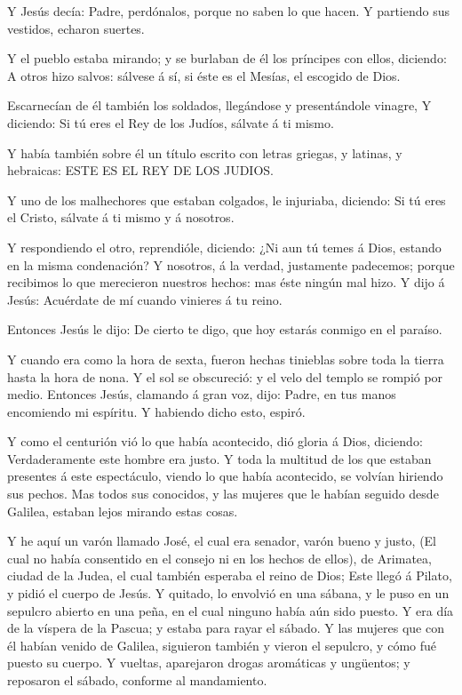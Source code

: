  Y Jesús decía: Padre, perdónalos, porque no saben lo que
hacen. Y partiendo sus vestidos, echaron suertes.

 Y el pueblo estaba mirando; y se burlaban de él los
príncipes con ellos, diciendo: A otros hizo salvos: sálvese á sí, si
éste es el Mesías, el escogido de Dios.

 Escarnecían de él también los soldados, llegándose y
presentándole vinagre,  Y diciendo: Si tú eres el Rey de
los Judíos, sálvate á ti mismo.

 Y había también sobre él un título escrito con letras
griegas, y latinas, y hebraicas: ESTE ES EL REY DE LOS JUDIOS.

 Y uno de los malhechores que estaban colgados, le
injuriaba, diciendo: Si tú eres el Cristo, sálvate á ti mismo y á
nosotros.

 Y respondiendo el otro, reprendióle, diciendo: ¿Ni aun tú
temes á Dios, estando en la misma condenación?  Y nosotros,
á la verdad, justamente padecemos; porque recibimos lo que merecieron
nuestros hechos: mas éste ningún mal hizo.  Y dijo á Jesús:
Acuérdate de mí cuando vinieres á tu reino.

 Entonces Jesús le dijo: De cierto te digo, que hoy estarás
conmigo en el paraíso.

 Y cuando era como la hora de sexta, fueron hechas
tinieblas sobre toda la tierra hasta la hora de nona.  Y el
sol se obscureció: y el velo del templo se rompió por medio.
 Entonces Jesús, clamando á gran voz, dijo: Padre, en tus
manos encomiendo mi espíritu. Y habiendo dicho esto, espiró.

 Y como el centurión vió lo que había acontecido, dió
gloria á Dios, diciendo: Verdaderamente este hombre era justo.
 Y toda la multitud de los que estaban presentes á este
espectáculo, viendo lo que había acontecido, se volvían hiriendo sus
pechos.  Mas todos sus conocidos, y las mujeres que le
habían seguido desde Galilea, estaban lejos mirando estas cosas.

 Y he aquí un varón llamado José, el cual era senador,
varón bueno y justo,  (El cual no había consentido en el
consejo ni en los hechos de ellos), de Arimatea, ciudad de la Judea, el
cual también esperaba el reino de Dios;  Este llegó á
Pilato, y pidió el cuerpo de Jesús.  Y quitado, lo envolvió
en una sábana, y le puso en un sepulcro abierto en una peña, en el cual
ninguno había aún sido puesto.  Y era día de la víspera de
la Pascua; y estaba para rayar el sábado.  Y las mujeres
que con él habían venido de Galilea, siguieron también y vieron el
sepulcro, y cómo fué puesto su cuerpo.  Y vueltas,
aparejaron drogas aromáticas y ungüentos; y reposaron el sábado,
conforme al mandamiento.

